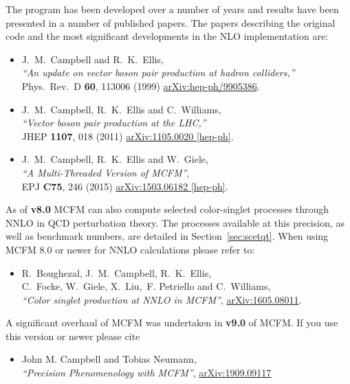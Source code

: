 The program has been
developed over a number of years and results have been presented in
a number of published papers.  The papers describing the original
code and the most significant developments in the NLO implementation are:
\begin{itemize}
\item J.~M.~Campbell and R.~K.~Ellis, \\
  {\it ``An update on vector boson pair production at hadron colliders,''} \\
  Phys.\ Rev.\ D {\bf 60}, 113006 (1999)
  \href{https://arxiv.org/abs/hep-ph/9905386}{arXiv:hep-ph/9905386}.
\item J.~M.~Campbell, R.~K.~Ellis and C.~Williams, \\
  {\it ``Vector boson pair production at the LHC,''} \\
  JHEP {\bf 1107}, 018 (2011)
  \href{https://arxiv.org/abs/1105.0020}{arXiv:1105.0020 [hep-ph]}. 
\item J.~M.~Campbell, R.~K.~Ellis and W.~Giele, \\
  {\it ``A Multi-Threaded Version of MCFM''}, \\
    EPJ {\bf C75}, 246 (2015)
    \href{https://arxiv.org/abs/1503.06182}{arXiv:1503.06182 [hep-ph]}.
\end{itemize}
 
As of \textbf{v8.0} MCFM can also compute selected color-singlet processes through NNLO in 
QCD perturbation theory.  The processes available at this precision, as well as
benchmark numbers, are detailed in Section~\ref{sec:scetqt}.  When using MCFM 8.0 or newer
for NNLO calculations please refer to:
\begin{itemize}
\item 
  R.~Boughezal, J.~M.~Campbell, R.~K.~Ellis, \\
   C.~Focke, W.~Giele, X.~Liu,~F. Petriello and  C.~Williams, \\
  {\it ``Color singlet production at NNLO in MCFM''},
  \href{https://arxiv.org/abs/1605.08011}{arXiv:1605.08011}.
\end{itemize}

A significant overhaul of MCFM was undertaken in \textbf{v9.0} of MCFM. If you use
this version or newer please cite
\begin{itemize}
\item    John M. Campbell and Tobias Neumann,\\
  {\it ``Precision Phenomenology with MCFM''},
  \href{https://arxiv.org/abs/1909.09117}{arXiv:1909.09117}
\end{itemize}

